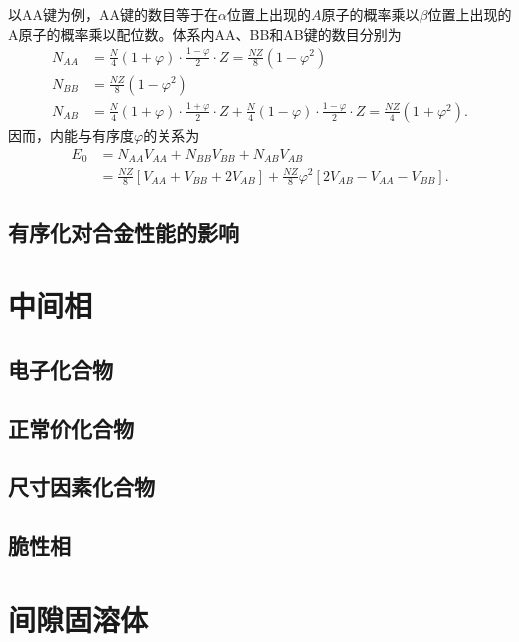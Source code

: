             以AA键为例，AA键的数目等于在$\alpha$位置上出现的$A$原子的概率乘以$\beta$位置上出现的
            A原子的概率乘以配位数。体系内AA、BB和AB键的数目分别为
            \begin{align}
                N_{A A}&=\frac{N}{4}(1+\varphi) \cdot \frac{1-\varphi}{2} \cdot Z=\frac{N Z}{8}\left(1-\varphi^{2}\right) \\
                N_{B B}&=\frac{N Z}{8}\left(1-\varphi^{2}\right) \\
                N_{A B}&=\frac{N}{4}(1+\varphi) \cdot \frac{1+\varphi}{2} \cdot Z+\frac{N}{4}(1-\varphi) \cdot \frac{1-\varphi}{2} \cdot Z=\frac{N Z}{4}(1+\varphi^2).
            \end{align}
            因而，内能与有序度$\varphi$的关系为
            \begin{align}
                E_{0}&=N_{A A} V_{A A}+N_{B B} V_{B B}+N_{A B} V_{A B} \\
                &=\frac{N Z}{8}\left[V_{A A}+V_{B B}+2 V_{A B}\right]+\frac{N Z}{8} \varphi^{2}\left[2 V_{A B}-V_{A A}-V_{B B}\right].
            \end{align}
        
        \subsection{有序化对合金性能的影响}
    \section{中间相}
        \subsection{电子化合物}
        \subsection{正常价化合物}
        \subsection{尺寸因素化合物}
        \subsection{脆性相}
    \section{间隙固溶体}